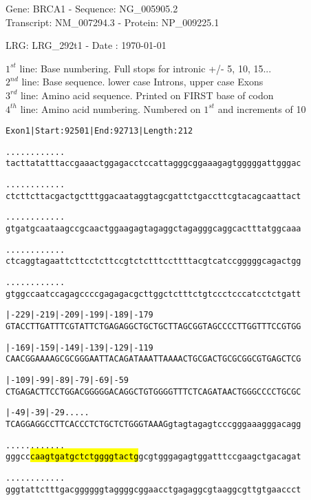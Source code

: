 \documentclass{article}
\begin{document}
\begin{center}
\begin{large}
Gene: BRCA1 - Sequence: NG\_005905.2\\
Transcript: NM\_007294.3 - Protein: NP\_009225.1
 
LRG: LRG\_292t1 - Date : \today
{}
\end{large}
\end{center}
$1^{st}$ line: Base numbering. Full stops for intronic +/- 5, 10, 15...\\
$2^{nd}$ line: Base sequence. lower case Introns, upper case Exons\\
$3^{rd}$ line: Amino acid sequence. Printed on FIRST base of codon\\
$4^{th}$ line: Amino acid numbering. Numbered on $1^{st}$ and increments of 10\\
\begin{alltt}
Exon 1 | Start: 92501 | End: 92713 | Length: 212

.    .    .    .    .    .    .    .    .    .    .    .    
tacttatatttaccgaaactggagacctccattagggcggaaagagtgggggattgggac

.    .    .    .    .    .    .    .    .    .    .    .    
ctcttcttacgactgctttggacaataggtagcgattctgaccttcgtacagcaattact

.    .    .    .    .    .    .    .    .    .    .    .    
gtgatgcaataagccgcaactggaagagtagaggctagagggcaggcactttatggcaaa

.    .    .    .    .    .    .    .    .    .    .    .    
ctcaggtagaattcttcctcttccgtctctttccttttacgtcatccgggggcagactgg

.    .    .    .    .    .    .    .    .    .    .    .    
gtggccaatccagagccccgagagacgcttggctctttctgtccctcccatcctctgatt

   |-229     |-219     |-209     |-199     |-189     |-179  
GTACCTTGATTTCGTATTCTGAGAGGCTGCTGCTTAGCGGTAGCCCCTTGGTTTCCGTGG

   |-169     |-159     |-149     |-139     |-129     |-119  
CAACGGAAAAGCGCGGGAATTACAGATAAATTAAAACTGCGACTGCGCGGCGTGAGCTCG

   |-109     |-99      |-89      |-79      |-69      |-59   
CTGAGACTTCCTGGACGGGGGACAGGCTGTGGGGTTTCTCAGATAACTGGGCCCCTGCGC

   |-49      |-39      |-29          .    .    .    .    .  
TCAGGAGGCCTTCACCCTCTGCTCTGGGTAAAGgtagtagagtcccgggaaagggacagg

  .    .    .    .    .    .    .    .    .    .    .    .  
gggcc\hl{caagtgatgctctggggtactg}gcgtgggagagtggatttccgaagctgacagat

  .    .    .    .    .    .    .    .    .    .    .    .  
gggtattctttgacggggggtaggggcggaacctgagaggcgtaaggcgttgtgaaccct

\end{alltt}
\end{document}
